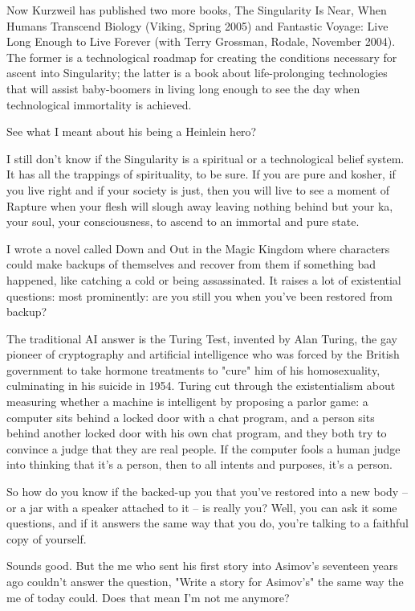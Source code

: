 Now Kurzweil has published two more books, The Singularity Is Near,
When Humans Transcend Biology (Viking, Spring 2005) and Fantastic
Voyage: Live Long Enough to Live Forever (with Terry Grossman,
Rodale, November 2004). The former is a technological roadmap for
creating the conditions necessary for ascent into Singularity; the
latter is a book about life-prolonging technologies that will
assist baby-boomers in living long enough to see the day when
technological immortality is achieved.

See what I meant about his being a Heinlein hero?

I still don't know if the Singularity is a spiritual or a
technological belief system. It has all the trappings of
spirituality, to be sure. If you are pure and kosher, if you live
right and if your society is just, then you will live to see a
moment of Rapture when your flesh will slough away leaving nothing
behind but your ka, your soul, your consciousness, to ascend to an
immortal and pure state.

I wrote a novel called Down and Out in the Magic Kingdom where
characters could make backups of themselves and recover from them
if something bad happened, like catching a cold or being
assassinated. It raises a lot of existential questions: most
prominently: are you still you when you've been restored from
backup?

The traditional AI answer is the Turing Test, invented by Alan
Turing, the gay pioneer of cryptography and artificial intelligence
who was forced by the British government to take hormone treatments
to "cure" him of his homosexuality, culminating in his suicide in
1954. Turing cut through the existentialism about measuring whether
a machine is intelligent by proposing a parlor game: a computer
sits behind a locked door with a chat program, and a person sits
behind another locked door with his own chat program, and they both
try to convince a judge that they are real people. If the computer
fools a human judge into thinking that it's a person, then to all
intents and purposes, it's a person.

So how do you know if the backed-up you that you've restored into a
new body -- or a jar with a speaker attached to it -- is really
you? Well, you can ask it some questions, and if it answers the
same way that you do, you're talking to a faithful copy of
yourself.

Sounds good. But the me who sent his first story into Asimov's
seventeen years ago couldn't answer the question, "Write a story
for Asimov's" the same way the me of today could. Does that mean
I'm not me anymore?

